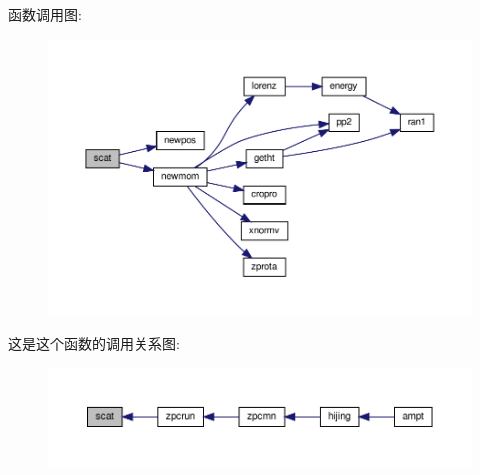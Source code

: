 函数调用图\+:
\nopagebreak
\begin{figure}[H]
\begin{center}
\leavevmode
\includegraphics[width=350pt]{scat_8f90_aca132ea02f1241f593836b016c71c848_cgraph}
\end{center}
\end{figure}
这是这个函数的调用关系图\+:
\nopagebreak
\begin{figure}[H]
\begin{center}
\leavevmode
\includegraphics[width=350pt]{scat_8f90_aca132ea02f1241f593836b016c71c848_icgraph}
\end{center}
\end{figure}
